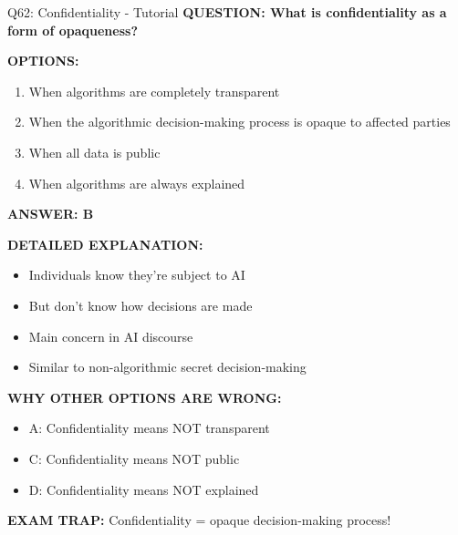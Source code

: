 \documentclass[8pt]{beamer}
\begin{document}
	\begin{frame}{Q62: Confidentiality - Tutorial}
		\fontsize{6.5}{7.5}\selectfont
		\textbf{QUESTION: What is confidentiality as a form of opaqueness?}
		
		\vspace{0.1cm}
		\textbf{OPTIONS:}
		\begin{enumerate}
			\item When algorithms are completely transparent
			\item When the algorithmic decision-making process is opaque to affected parties
			\item When all data is public
			\item When algorithms are always explained
		\end{enumerate}
		
		\vspace{0.1cm}
		\textcolor{myblue}{\textbf{ANSWER: B}}
		
		\vspace{0.1cm}
		\textbf{DETAILED EXPLANATION:}
		\begin{itemize}
			\item Individuals know they're subject to AI
			\item But don't know how decisions are made
			\item Main concern in AI discourse
			\item Similar to non-algorithmic secret decision-making
		\end{itemize}
		
		\vspace{0.1cm}
		\textcolor{myred}{\textbf{WHY OTHER OPTIONS ARE WRONG:}}
		\begin{itemize}
			\item \textcolor{myred}{A:} Confidentiality means NOT transparent
			\item \textcolor{myred}{C:} Confidentiality means NOT public
			\item \textcolor{myred}{D:} Confidentiality means NOT explained
		\end{itemize}
		
		\textcolor{myred}{\textbf{EXAM TRAP:}} Confidentiality = \textcolor{myblue}{opaque decision-making process}!
	\end{frame}
	
\end{document}

